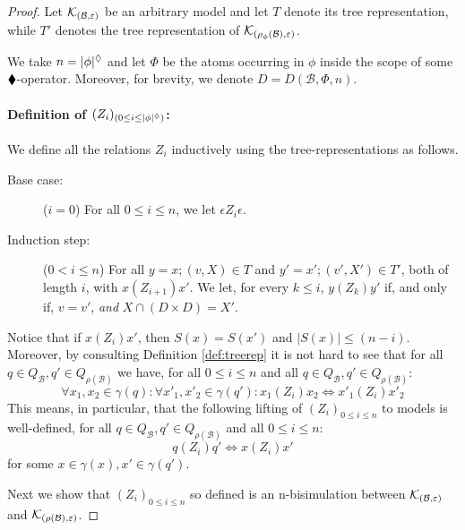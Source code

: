 \documentclass{llncs}
\newcommand{\carriers}[1]{Q_{#1}}
\newcommand{\kmod}[2]{{\cal K}_{(#1,#2)}}
\newcommand{\views}{\mathcal B}
\newcommand{\sem}{\varepsilon}
\newcommand{\depth}[1]{|{#1}|^\adia}
\begin{document}
\begin{proof}
Let $\kmod \views \sem$ be an arbitrary model and let $T$ denote its tree representation, while $T'$ denotes the tree representation of $\kmod {\rho_\phi(\views)} \sem$.

We take $n = \depth{\phi}$ and let $\Phi$ be the atoms occurring in $\phi$ inside the scope of some $\blacklozenge$-operator. Moreover, for brevity, we denote $D = D(\views, \Phi, n)$. %

\paragraph{Definition of $(Z_i)_{(0 \leq i \leq \depth{\phi})}$: } 
We define all the relations $Z_i$ inductively using the tree-representations as follows.
\begin{description}
\item[Base case: ] ($i = 0$) For all $0 \leq i \leq n$, we let $\epsilon Z_i \epsilon$. 
\item[Induction step: ] ($0 < i \leq n$) For all $y = x;(v, X) \in T$ and $y' = x';(v', X') \in T'$, both of length $i$, with $x (Z_{i+1}) x'$. We let, for every $k \leq i$, $y (Z_k) y'$ if, and only if, $v = v'$, \emph{and} $X \cap (D \times D)= X'$.
\end{description}

Notice that if $x (Z_i) x'$, then $S(x) = S(x')$ and $|S(x)| \leq (n - i)$. Moreover, by consulting Definition \ref{def:treerep} it is not hard to see that for all $q \in  \carriers \views , q' \in \carriers {\rho(\views)}$ we have, for all $0 \leq i \leq n$ and all $q \in \carriers \views,q' \in \carriers {\rho(\views)}$: 
$$
\forall x_1,x_2 \in \gamma(q): \forall x'_1,x'_2 \in \gamma(q'): x_1(Z_i)x_2 \iff x'_1 (Z_i) x'_2 
$$
This means, in particular, that the following lifting of $(Z_i)_{0 \leq i \leq n}$ to models is well-defined, for all $q \in \carriers \views, q' \in \carriers {\rho(\views)}$ and all $0 \leq i \leq n$:
$$
q(Z_i)q' \iff x(Z_i)x' 
$$
for some $x \in \gamma(x), x' \in \gamma(q')$.

Next we show that $(Z_i)_{0 \leq i \leq n}$ so defined is an n-bisimulation between $\kmod \views \sem$ and $\kmod {\rho(\views)} \sem$.


\end{proof}
\end{document}
